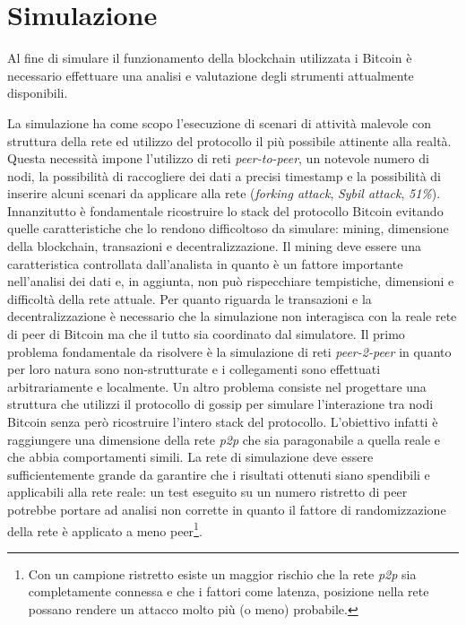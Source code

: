 \chapter{Simulazione}
Al fine di simulare il funzionamento della blockchain utilizzata i Bitcoin è necessario effettuare una analisi e valutazione degli strumenti attualmente disponibili.

La simulazione ha come scopo l'esecuzione di scenari di attività malevole con struttura della rete ed utilizzo del protocollo il più possibile attinente alla realtà. Questa necessità impone l'utilizzo di reti \textit{peer-to-peer}, un notevole numero di nodi, la possibilità di raccogliere dei dati a precisi timestamp e la possibilità di inserire alcuni scenari da applicare alla rete (\textit{forking attack}, \textit{Sybil attack}, \textit{51\%}).\newline
Innanzitutto è fondamentale ricostruire lo stack del protocollo Bitcoin evitando quelle caratteristiche che lo rendono difficoltoso da simulare: mining, dimensione della blockchain, transazioni e decentralizzazione.\newline
Il mining deve essere una caratteristica controllata dall'analista in quanto è un fattore importante nell'analisi dei dati e, in aggiunta, non può rispecchiare tempistiche, dimensioni e difficoltà della rete attuale.\newline
Per quanto riguarda le transazioni e la decentralizzazione è necessario che la simulazione non interagisca con la reale rete di peer di Bitcoin ma che il tutto sia coordinato dal simulatore.\newline
Il primo problema fondamentale da risolvere è la simulazione di reti \textit{peer-2-peer} in quanto per loro natura sono non-strutturate e i collegamenti sono effettuati arbitrariamente e localmente. Un altro problema consiste nel progettare una struttura che utilizzi il protocollo di gossip per simulare l'interazione tra nodi Bitcoin senza però ricostruire l'intero stack del protocollo. L'obiettivo infatti è raggiungere una dimensione della rete \textit{p2p} che sia paragonabile a quella reale e che abbia comportamenti simili. La rete di simulazione deve essere sufficientemente grande da garantire che i risultati ottenuti siano spendibili e applicabili alla rete reale: un test eseguito su un numero ristretto di peer potrebbe portare ad analisi non corrette in quanto il fattore di randomizzazione della rete è applicato a meno peer\footnote{Con un campione ristretto esiste un maggior rischio che la rete \textit{p2p} sia completamente connessa e che i fattori come latenza, posizione nella rete possano rendere un attacco molto più (o meno) probabile.}.\newline
